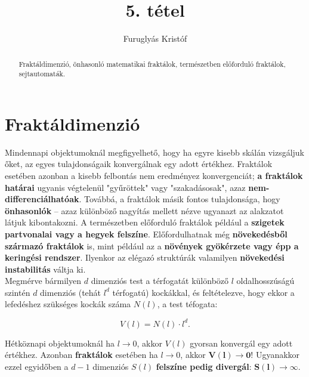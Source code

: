 \documentclass[12pt]{article}
\theoremstyle{plain}
\begin{document}
\title{5. tétel}
\author{Furuglyás Kristóf}

\maketitle


\newpage
\begin{abstract}
    Fraktáldimenzió, önhasonló matematikai fraktálok, természetben előforduló fraktálok, sejtautomaták.
\end{abstract}

\section{Fraktáldimenzió}
Mindennapi objektumoknál megfigyelhető, hogy ha egyre kisebb skálán vizsgáljuk őket, az egyes tulajdonságaik konvergálnak egy adott értékhez. Fraktálok esetében azonban a kisebb felbontás nem eredményez konvergenciát; \textbf{a fraktálok határai} ugyanis végtelenül "gyűröttek" vagy "szakadásosak", azaz \textbf{nem-differenciálhatóak}. Továbbá, a fraktálok másik fontos tulajdonsága, hogy \textbf{önhasonlók} -- azaz különböző nagyítás mellett nézve ugyanazt az alakzatot látjuk kibontakozni. A természetben előforduló fraktálok például a \textbf{szigetek partvonalai vagy a hegyek felszíne}. Előfordulhatnak még \textbf{növekedésből származó fraktálok} is, mint például az a \textbf{növények gyökérzete vagy épp a keringési rendszer}. Ilyenkor az elégazó struktúrák valamilyen \textbf{növekedési instabilitás} váltja ki. \\

Megmérve bármilyen $d$ dimenziós test a térfogatát különböző $l$ oldalhosszúságú szintén $d$ dimenziós (tehát $l^d$ térfogatú) kockákkal, és feltételezve, hogy ekkor a lefedéshez szükséges kockák száma $N \left( l \right)$, a test téfogata: 

\begin{equation}
V \left( l \right) =  N \left( l \right) \cdot l^d.
\end{equation}

Hétköznapi objektumoknál ha $l \rightarrow 0$, akkor $V \left(l \right)$ gyorsan konvergál egy adott értékhez. Azonban \textbf{fraktálok} esetében ha $l \rightarrow 0$, akkor $\mathbf{V \left(l \right) \rightarrow 0}$! Ugyanakkor ezzel egyidőben a $d-1$ dimenziós $S \left( l\right)$ \textbf{felszíne pedig divergál}: $\mathbf{ S \left( l \right) \rightarrow \infty}$. \\
\end{document}
